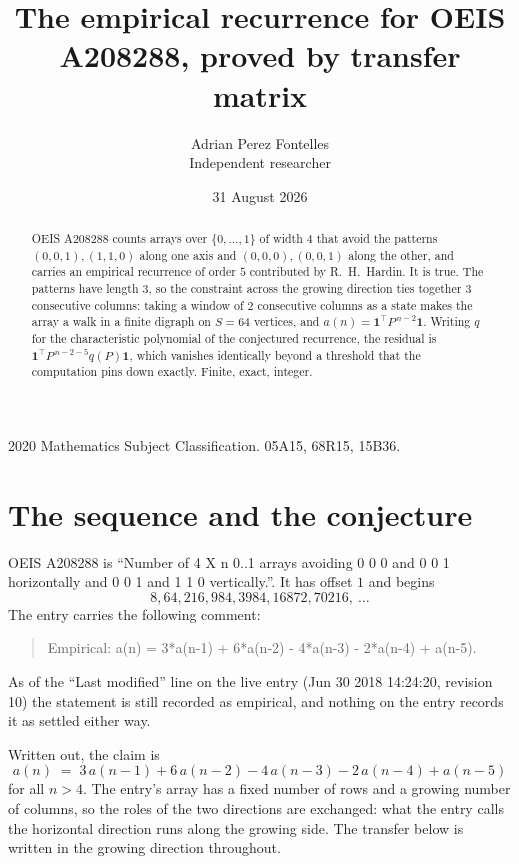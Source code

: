 \documentclass[11pt,a4paper]{article}
\title{The empirical recurrence for OEIS A208288, proved by transfer matrix}
\author{Adrian Perez Fontelles\\ \small Independent researcher}
\date{31 August 2026}
\theoremstyle{plain}
\theoremstyle{definition}
\begin{document}
\maketitle

\begin{abstract}
OEIS A208288 counts arrays over $\{0,\dots,1\}$ of width $4$ that avoid the patterns
$(0,0,1), (1,1,0)$ along one axis and $(0,0,0), (0,0,1)$ along the other, and carries an empirical recurrence of
order $5$ contributed by R.~H.~Hardin. It is true. The patterns have length $3$, so
the constraint across the growing direction ties together $3$ consecutive columns: taking a
window of $2$ consecutive columns as a state makes the array a walk in a finite digraph
on $S=64$ vertices, and $a(n)=\mathbf{1}^{\!\top}P^{\,n-2}\mathbf{1}$. Writing $q$
for the characteristic polynomial of the conjectured recurrence, the residual is
$\mathbf{1}^{\!\top}P^{\,n-2-5}q(P)\mathbf{1}$, which vanishes identically
beyond a threshold that the computation pins down exactly. Finite, exact, integer.
\end{abstract}

\noindent\small 2020 Mathematics Subject Classification. 05A15, 68R15, 15B36.\normalsize

\section{The sequence and the conjecture}

OEIS A208288 is ``Number of 4 X n 0..1 arrays avoiding 0 0 0 and 0 0 1 horizontally and 0 0 1 and 1 1 0 vertically.''. It has offset
$1$ and begins
\[
8, 64, 216, 984, 3984, 16872, 70216,\ \dots
\]
The entry carries the following comment:
\begin{quote}\small
Empirical: a(n) = 3*a(n-1) + 6*a(n-2) - 4*a(n-3) - 2*a(n-4) + a(n-5).
\end{quote}
As of the ``Last modified'' line on the live entry (Jun 30 2018 14:24:20, revision
10) the statement is still recorded as empirical, and nothing on the entry
records it as settled either way.

Written out, the claim is
\begin{equation}\label{eq:conj}
a(n)\;=\;3\,a(n-1) + 6\,a(n-2) - 4\,a(n-3) - 2\,a(n-4) + a(n-5)
\end{equation}
for all $n>4$. The entry's array has a fixed number of rows and a growing number of
columns, so the roles of the two directions are exchanged: what the entry calls the
horizontal direction runs along the growing side. The transfer below is written in the
growing direction throughout.
\end{document}
